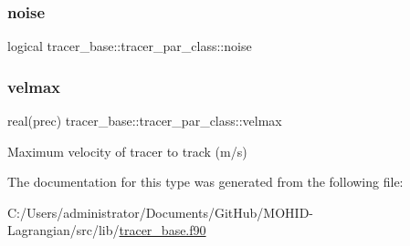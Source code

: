\subsubsection{\texorpdfstring{noise}{noise}}
{\footnotesize\ttfamily logical tracer\+\_\+base\+::tracer\+\_\+par\+\_\+class\+::noise\hspace{0.3cm}{\ttfamily [private]}}

\mbox{\label{structtracer__base_1_1tracer__par__class_a7a6df785a9abc654a774b25fedb3c1e6}} 
\subsubsection{\texorpdfstring{velmax}{velmax}}
{\footnotesize\ttfamily real(prec) tracer\+\_\+base\+::tracer\+\_\+par\+\_\+class\+::velmax\hspace{0.3cm}{\ttfamily [private]}}



Maximum velocity of tracer to track (m/s) 



The documentation for this type was generated from the following file\+:\begin{DoxyCompactItemize}
\item 
C\+:/\+Users/administrator/\+Documents/\+Git\+Hub/\+M\+O\+H\+I\+D-\/\+Lagrangian/src/lib/\hyperlink{tracer__base_8f90}{tracer\+\_\+base.\+f90}\end{DoxyCompactItemize}
